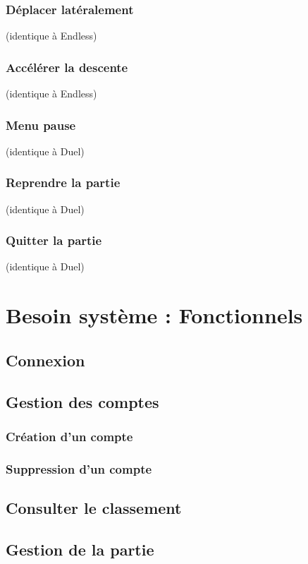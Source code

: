 \documentclass{article}
\begin{document}
\subsubsection*{Déplacer latéralement} (identique à Endless)
\subsubsection*{Accélérer la descente} (identique à Endless)
\subsubsection*{Menu pause} (identique à Duel)
\subsubsection*{Reprendre la partie} (identique à Duel)
\subsubsection*{Quitter la partie} (identique à Duel)

\section{Besoin système : Fonctionnels}

\subsection{Connexion}

\subsection{Gestion des comptes}

\subsubsection{Création d'un compte}

\subsubsection{Suppression d'un compte}

\subsection{Consulter le classement}

\subsection{Gestion de la partie}
\end{document}
